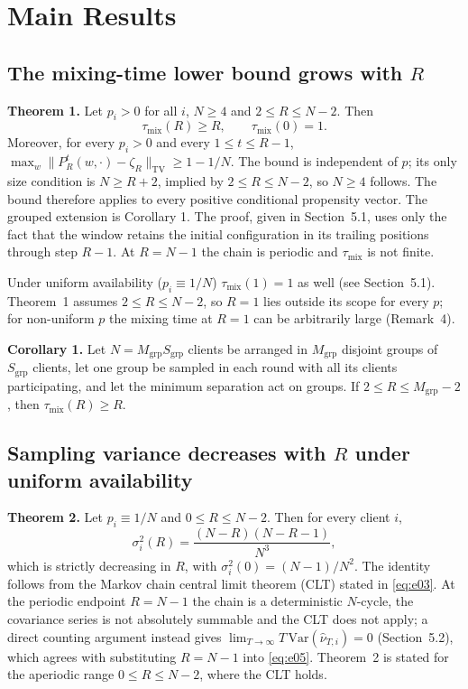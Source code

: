 \documentclass[twoside,11pt]{article}
\begin{document}
\section{Main Results}
\subsection{\texorpdfstring{The mixing-time lower bound grows with $R$}{The mixing-time lower bound grows with R}}
\textbf{Theorem 1.} Let $p_i>0$ for all $i$, $N\geq4$ and $2\leq R\leq N-2$. Then
\begin{equation}\label{eq:e04}
\tau_{\mathrm{mix}}(R)\geq R,\qquad \tau_{\mathrm{mix}}(0)=1.
\end{equation}
Moreover, for every $p_i>0$ and every $1\leq t\leq R-1$, $\max_w\|P_R^{t}(w,\cdot)-\zeta_R\|_{\mathrm{TV}}\geq1-1/N$. The bound is independent of $p$; its only size condition is $N\geq R+2$, implied by $2\leq R\leq N-2$, so $N\geq4$ follows. The bound therefore applies to every positive conditional propensity vector. The grouped extension is Corollary 1. The proof, given in Section~5.1, uses only the fact that the window retains the initial configuration in its trailing positions through step $R-1$. At $R=N-1$ the chain is periodic and $\tau_{\mathrm{mix}}$ is not finite.

Under uniform availability ($p_i\equiv1/N$) $\tau_{\mathrm{mix}}(1)=1$ as well (see Section~5.1). Theorem~1 assumes $2\leq R\leq N-2$, so $R=1$ lies outside its scope for every $p$; for non-uniform $p$ the mixing time at $R=1$ can be arbitrarily large (Remark~4).

\textbf{Corollary 1.} Let $N=M_{\mathrm{grp}}S_{\mathrm{grp}}$ clients be arranged in $M_{\mathrm{grp}}$ disjoint groups of $S_{\mathrm{grp}}$ clients, let one group be sampled in each round with all its clients participating, and let the minimum separation act on groups. If $2\leq R\leq M_{\mathrm{grp}}-2$, then $\tau_{\mathrm{mix}}(R)\geq R$.

\subsection{\texorpdfstring{Sampling variance decreases with $R$ under uniform availability}{Sampling variance decreases with R under uniform availability}}
\textbf{Theorem 2.} Let $p_i\equiv1/N$ and $0\leq R\leq N-2$. Then for every client $i$,
\begin{equation}\label{eq:e05}
\sigma_i^{2}(R)=\dfrac{(N-R)(N-R-1)}{N^{3}},
\end{equation}
which is strictly decreasing in $R$, with $\sigma_i^{2}(0)=(N-1)/N^{2}$. The identity follows from the Markov chain central limit theorem (CLT) stated in \eqref{eq:e03}. At the periodic endpoint $R=N-1$ the chain is a deterministic $N$-cycle, the covariance series is not absolutely summable and the CLT does not apply; a direct counting argument instead gives $\lim_{T\to\infty}T\,\mathrm{Var}(\hat\nu_{T,i})=0$ (Section~5.2), which agrees with substituting $R=N-1$ into \eqref{eq:e05}. Theorem~2 is stated for the aperiodic range $0\leq R\leq N-2$, where the CLT holds.
\end{document}
